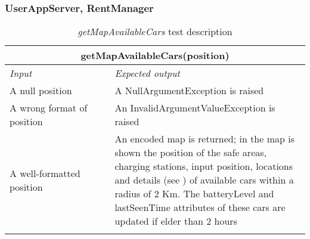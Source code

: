 \subsubsection{UserAppServer, RentManager}

\begin{longtable}{p{0.35\linewidth}p{0.65\linewidth}}
\multicolumn{2}{c}{\textbf{getMapAvailableCars(position)}} \\
\toprule
\emph{Input} & \emph{Expected output} \\
\midrule
A null position & A NullArgumentException is raised\\
\midrule
A wrong format of position & An InvalidArgumentValueException is raised \\
\midrule
A well-formatted position & An encoded map is returned; in the map is shown the position of the safe areas, charging stations, input position, locations and details (see \cite{DD}) of available cars within a radius of 2 Km. The batteryLevel and lastSeenTime attributes of these cars are updated if elder than 2 hours\\
\bottomrule
\caption{\emph{getMapAvailableCars} test description}
\end{longtable}

\clearpage

